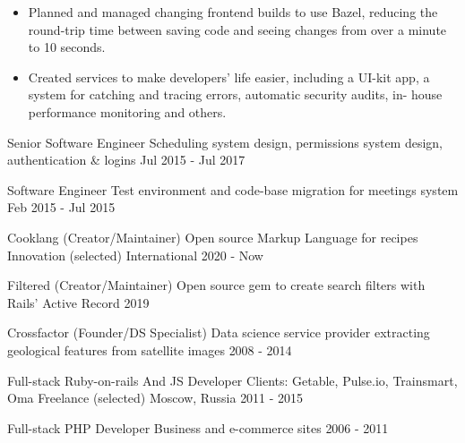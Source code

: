\begin{cventries}
{\begin{itemize}
            \item {Planned and managed changing frontend builds to use Bazel, reducing the round-trip time between saving code and seeing changes from over a minute to 10 seconds.}
            \item {Created services to make developers’ life easier, including a UI-kit app, a system for catching and tracing errors, automatic security audits, in- house performance monitoring and others.}
        \end{itemize}
    }

    \cvblitz
    {Senior Software Engineer} %
    {Scheduling system design, permissions system design, authentication \& logins} %
    {} %
    {} %
    {Jul 2015 - Jul 2017} %

    \cvblitz
    {Software Engineer} %
    {Test environment and code-base migration for meetings system} %
    {} %
    {} %
    {Feb 2015 - Jul 2015} %

    \cvblitz
    {Cooklang (Creator/Maintainer)} %
    {Open source Markup Language for recipes} %
    {Innovation (selected)} %
    {International} %
    {2020 - Now} %

    \cvblitz
    {Filtered (Creator/Maintainer)} %
    {Open source gem to create search filters with Rails’ Active Record} %
    {} %
    {} %
    {2019} %

    \cvblitz
    {Crossfactor (Founder/DS Specialist)} %
    {Data science service provider extracting geological features from satellite images} %
    {} %
    {} %
    {2008 - 2014} %

    \cvblitz
    {Full-stack Ruby-on-rails And JS Developer} %
    {Clients: Getable, Pulse.io, Trainsmart, Oma} %
    {Freelance (selected)} %
    {Moscow, Russia} %
    {2011 - 2015} %

    \cvblitz
    {Full-stack PHP Developer} %
    {Business and e-commerce sites} %
    {} %
    {} %
    {2006 - 2011} %

\end{cventries}
